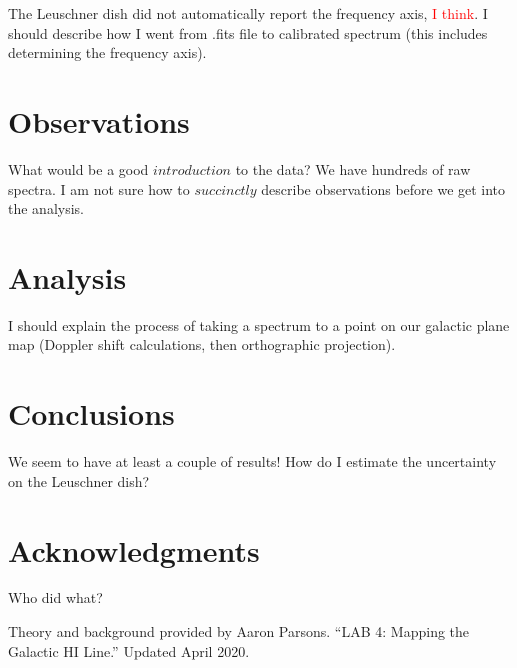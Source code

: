 \documentclass[12pt]{article}
\begin{document}
The Leuschner dish did not automatically report the frequency axis, \textcolor{red}{I think}. I should describe how I went from .fits file to calibrated spectrum (this includes determining the frequency axis).


\section{Observations}

\quad \quad What would be a good $introduction$ to the data? We have hundreds of raw spectra. I am not sure how to $succinctly$ describe observations before we get into the analysis.

\section{Analysis}

\quad \quad I should explain the process of taking a spectrum to a point on our galactic plane map (Doppler shift calculations, then orthographic projection). 

\section{Conclusions}

\quad \quad We seem to have at least a couple of results! How do I estimate the uncertainty on the Leuschner dish?

\section{Acknowledgments}

\quad \quad Who did what?

Theory and background provided by Aaron Parsons. ``LAB 4: Mapping the Galactic HI Line.'' Updated April 2020.

\end{document}
